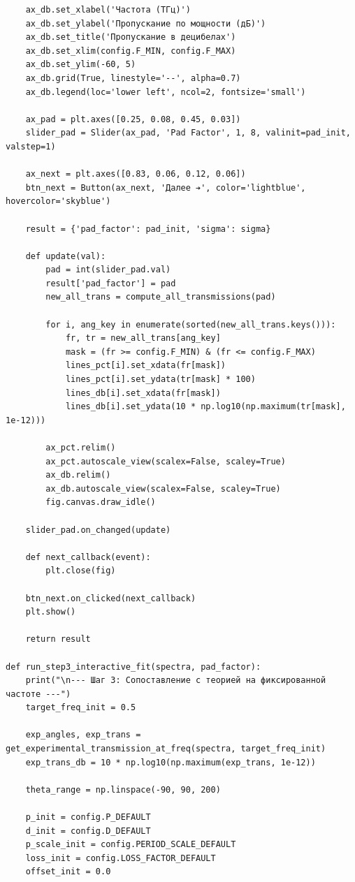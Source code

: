 \begin{verbatim}
    ax_db.set_xlabel('Частота (ТГц)')
    ax_db.set_ylabel('Пропускание по мощности (дБ)')
    ax_db.set_title('Пропускание в децибелах')
    ax_db.set_xlim(config.F_MIN, config.F_MAX)
    ax_db.set_ylim(-60, 5)
    ax_db.grid(True, linestyle='--', alpha=0.7)
    ax_db.legend(loc='lower left', ncol=2, fontsize='small')
    
    ax_pad = plt.axes([0.25, 0.08, 0.45, 0.03])
    slider_pad = Slider(ax_pad, 'Pad Factor', 1, 8, valinit=pad_init, valstep=1)
    
    ax_next = plt.axes([0.83, 0.06, 0.12, 0.06])
    btn_next = Button(ax_next, 'Далее ➔', color='lightblue', hovercolor='skyblue')
    
    result = {'pad_factor': pad_init, 'sigma': sigma}
    
    def update(val):
        pad = int(slider_pad.val)
        result['pad_factor'] = pad
        new_all_trans = compute_all_transmissions(pad)
        
        for i, ang_key in enumerate(sorted(new_all_trans.keys())):
            fr, tr = new_all_trans[ang_key]
            mask = (fr >= config.F_MIN) & (fr <= config.F_MAX)
            lines_pct[i].set_xdata(fr[mask])
            lines_pct[i].set_ydata(tr[mask] * 100)
            lines_db[i].set_xdata(fr[mask])
            lines_db[i].set_ydata(10 * np.log10(np.maximum(tr[mask], 1e-12)))
            
        ax_pct.relim()
        ax_pct.autoscale_view(scalex=False, scaley=True)
        ax_db.relim()
        ax_db.autoscale_view(scalex=False, scaley=True)
        fig.canvas.draw_idle()
        
    slider_pad.on_changed(update)
    
    def next_callback(event):
        plt.close(fig)
        
    btn_next.on_clicked(next_callback)
    plt.show()
    
    return result

def run_step3_interactive_fit(spectra, pad_factor):
    print("\n--- Шаг 3: Сопоставление с теорией на фиксированной частоте ---")
    target_freq_init = 0.5
    
    exp_angles, exp_trans = get_experimental_transmission_at_freq(spectra, target_freq_init)
    exp_trans_db = 10 * np.log10(np.maximum(exp_trans, 1e-12))
    
    theta_range = np.linspace(-90, 90, 200)
    
    p_init = config.P_DEFAULT
    d_init = config.D_DEFAULT
    p_scale_init = config.PERIOD_SCALE_DEFAULT
    loss_init = config.LOSS_FACTOR_DEFAULT
    offset_init = 0.0
    

\end{verbatim}
